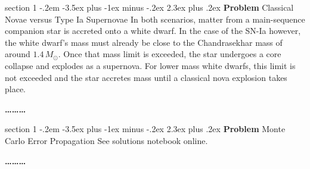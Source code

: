 \documentclass[letterpaper,12pt,twoside=false,DIV=11]{scrartcl}
\makeatletter
\newenvironment{problem}{\@startsection
    {section}
    {1}
    {-.2em}
    {-3.5ex plus -1ex minus -.2ex}
    {2.3ex plus .2ex}
    {
        \pagebreak[3] %
        \noindent\sffamily\bfseries Problem
    }
}
{
    \begin{center}\large\bfseries\ldots\ldots\ldots\end{center}
}
\makeatother
\begin{document}
\begin{problem}{Classical Novae versus Type Ia Supernovae}
In both scenarios, matter from a main-sequence companion star is accreted onto a white dwarf. In the case of the SN-Ia however, the white dwarf's mass must already be close to the Chandrasekhar mass of around $1.4\,M_\odot$. Once that mass limit is exceeded, the star undergoes a core collapse and explodes as a supernova. For lower mass white dwarfs, this limit is not exceeded and the star accretes mass until a classical nova explosion takes place.
\end{problem}

\begin{problem}{Monte Carlo Error Propagation}
See solutions notebook online.
\end{problem}
\end{document}
